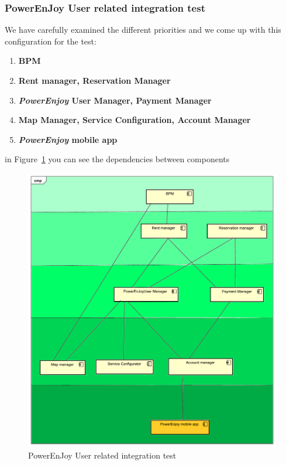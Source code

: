 \documentclass[english]{article}
\newcommand{\powerenjoy}{\textit{PowerEnjoy }}
\begin{document}
		\subsubsection{PowerEnJoy User related integration test}
			We have carefully examined the different priorities and we come up with this configuration for the test:
			\begin{enumerate}
				\item \textbf{BPM} 
				\item \textbf{Rent manager, Reservation Manager} 
				\item \textbf{\powerenjoy User Manager, Payment Manager}
				\item \textbf{Map Manager, Service Configuration, Account Manager} 
				\item \textbf{\powerenjoy mobile app} 
			\end{enumerate}
			in Figure~\ref{fig:powerenjoyuser} you can see the dependencies between components 
			\begin{figure}[H]
				\centering
				\includegraphics[scale=0.4]{./testingOrganization/powerenjoyuser.pdf}%
				\caption{PowerEnJoy User related integration test}
				\label{fig:powerenjoyuser}
			\end{figure}
			
\end{document}
